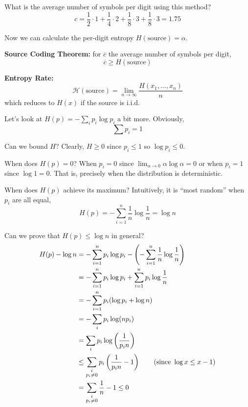 \documentclass[12pt]{report}
\renewcommand{\bar}[1]{\overline{#1}}
\newcommand*{\tbf}[1]{\ifmmode\mathbf{#1}\else\textbf{#1}\fi}
\newenvironment*{proposition}[1][gray]{
    \begin{tcolorbox}[
        parbox=false,
        colback=#1!5!white,
        colframe=#1!75!black,
        breakable
    ]}
    {\end{tcolorbox}}
\begin{document}
What is the average number of symbols per digit using this method? 
\[c = \frac{1}{2} \cdot 1 + \frac{1}{4} \cdot 2 + \frac{1}{8} \cdot 3 + \frac{1}{8} \cdot 3 = 1.75\]

Now we can calculate the per-digit entropy $H(\text{source}) = \alpha$. 

\begin{proposition}
    \textbf{Source Coding Theorem:} for $\bar c$ the average number of symbols per digit, 
    \[\bar c \geq H(\text{source})\] 
\end{proposition}

\tbf{Entropy Rate:}
\[\mathcal H(\text{source}) = \lim_{n \to \infty} \frac{H(x_1, \dots, x_n)}{n}\]
which reduces to $H(x)$ if the source is i.i.d.

Let's look at $H(p) = -\sum_i p_i \log p_i$ a bit more. Obviously, 
\[\sum p_i = 1\]

Can we bound $H$? Clearly, $H \geq 0$ since $p_i \leq 1$ so $\log p_i \leq 0$.

When does $H(p) = 0$? When $p_i = 0$ since $\lim_{\alpha \to 0} \alpha \log \alpha = 0$ or when $p_i = 1$ since $\log 1 = 0$. That is, precisely when the distribution is deterministic.

When does $H(p)$ achieve its maximum? Intuitively, it is ``most random'' when $p_i$ are all equal,
\[H(p) = -\sum_{i=1}^n \frac{1}{n} \log \frac{1}{n} = \log n\] 

Can we prove that $H(p) \leq \log n$ in general?
\begin{align*}
    H(p) - \log n &= -\sum_{i=1}^n p_i \log p_i - \left(-\sum_{i=1}^n \frac{1}{n} \log \frac{1}{n}\right) \\
    &= -\sum_{i=1}^n p_i \log p_i + \sum_{i=1}^n p_i \log \frac{1}{n} \\
    &= -\sum_{i=1}^n p_i (\log p_i + \log n)\\ 
    &= -\sum_i p_i \log (n p_i)\\
    &= \sum_i p_i \log \left(\frac{1}{p_i n}\right)\\ 
    &\leq \sum_{\begin{subarray}{c}
        i\\ p_i \neq 0
    \end{subarray}} p_i \left(\frac{1}{p_i n} - 1\right) \qquad (\text{since } \log x \leq x - 1)\\ 
    &= \sum_{\begin{subarray}{c}
        i\\ p_i \neq 0
    \end{subarray}} \frac{1}{n} - 1 \leq 0
\end{align*}
\end{document}
